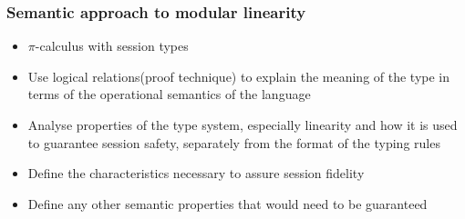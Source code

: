 \begin{frame}\frametitle{Semantic approach to modular linearity}
  \begin{itemize}
    \item $\pi$-calculus with session types
    \item Use logical relations(proof technique) to explain the meaning of the type in terms of the operational semantics of the language
    \item Analyse properties of the type system, especially linearity and how it is used to guarantee session safety, separately from the format of the typing rules
    \item Define the characteristics necessary to assure session fidelity
    \item Define any other semantic properties that would need to be guaranteed
  \end{itemize}


\end{frame}
